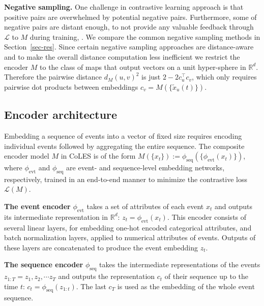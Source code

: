 \documentclass[sigconf, anonymous]{acmart}
\newcommand{\R}{\mathbb{R}}
\begin{document}
\textbf{Negative sampling.} One challenge in contrastive learning approach is that positive pairs
are overwhelmed by potential negative pairs. Furthermore, some of negative pairs are distant enough,
to not provide any valuable feedback through $\mathcal{L}$ to $M$ during training, \citep{SimoSerra2015DiscriminativeLO,Schroff2015FaceNetAU}. We compare the common negative sampling
methods in Section~\ref{sec-res}. Since certain negative sampling approaches are distance-aware and
to make the overall distance computation less inefficient we restrict the encoder $M$ to the class
of maps that output vectors on a unit hyper-sphere in $\R^d$. Therefore the pairwise distance $
    d_M(u, v)^2
$ is just $2 - 2 c_u^\top c_v$, which only requires pairwise dot products between embeddings $
    c_v = M(\{\tilde{x}_u(t)\})
$.

\subsection{Encoder architecture} \label{sec-enc-arch}

Embedding a sequence of events into a vector of fixed size requires encoding individual events
followed by aggregating the entire sequence. The composite encoder model $M$ in CoLES is of
the form $
    M(\{x_t\})
        := \phi_{\mathrm{seq}}(
            \{\phi_{\mathrm{evt}}(x_t)\}
        )
$, where $\phi_{\mathrm{evt}}$ and $\phi_{\mathrm{seq}}$ are event- and sequence-level
embedding networks, respectively, trained in an end-to-end manner to minimize the contrastive
loss  $\mathcal{L}(M)$.

\textbf{The event encoder} $\phi_{\mathrm{evt}}$ takes a set of attributes of each event $x_t$
and outputs its intermediate representation in $\R^d$: $z_t = \phi_{\mathrm{evt}}(x_t)$. This
encoder consists of several linear layers, for embedding one-hot encoded categorical attributes,
and batch normalization layers, applied to numerical attributes of events. Outputs of these
layers are concatenated to produce the event embedding $z_t$.

\textbf{The sequence encoder} $\phi_{\mathrm{seq}}$ takes the intermediate representations of
the events $ z_{1:T} = z_1, z_2, \cdots z_T $ and outputs the representation $c_t$ of their
sequence up to the time $t$: $c_t = \phi_{\mathrm{seq}}(z_{1:t})$. The last $c_T$ is used
as the embedding of the whole event sequence.
\end{document}
